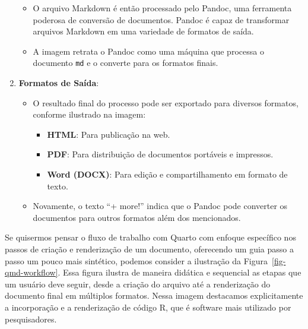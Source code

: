\documentclass[
  a4paper,
]{book}
\providecommand{\tightlist}{%
  \setlength{\itemsep}{0pt}\setlength{\parskip}{0pt}}\usepackage{longtable,booktabs,array}
\begin{document}
\begin{tcolorbox}
\begin{enumerate}
  \begin{itemize}
  \tightlist
  \item
    O arquivo Markdown é então processado pelo Pandoc, uma ferramenta
    poderosa de conversão de documentos. Pandoc é capaz de transformar
    arquivos Markdown em uma variedade de formatos de saída.
  \item
    A imagem retrata o Pandoc como uma máquina que processa o documento
    \texttt{md} e o converte para os formatos finais.
  \end{itemize}
\item
  \textbf{Formatos de Saída}:

  \begin{itemize}
  \tightlist
  \item
    O resultado final do processo pode ser exportado para diversos
    formatos, conforme ilustrado na imagem:

    \begin{itemize}
    \tightlist
    \item
      \textbf{HTML}: Para publicação na web.
    \item
      \textbf{PDF}: Para distribuição de documentos portáveis e
      impressos.
    \item
      \textbf{Word (DOCX)}: Para edição e compartilhamento em formato de
      texto.
    \end{itemize}
  \item
    Novamente, o texto ``+ more!'' indica que o Pandoc pode converter os
    documentos para outros formatos além dos mencionados.
  \end{itemize}
\end{enumerate}

\end{tcolorbox}

Se quisermos pensar o fluxo de trabalho com Quarto com enfoque
específico nos passos de criação e renderização de um documento,
oferecendo um guia passo a passo um pouco mais sintético, podemos
consider a ilustração da Figura~\ref{fig-qmd-workflow}. Essa figura
ilustra de maneira didática e sequencial as etapas que um usuário deve
seguir, desde a criação do arquivo até a renderização do documento final
em múltiplos formatos. Nessa imagem destacamos explicitamente a
incorporação e a renderização de código R, que é software mais utilizado
por pesquisadores.
\end{document}
